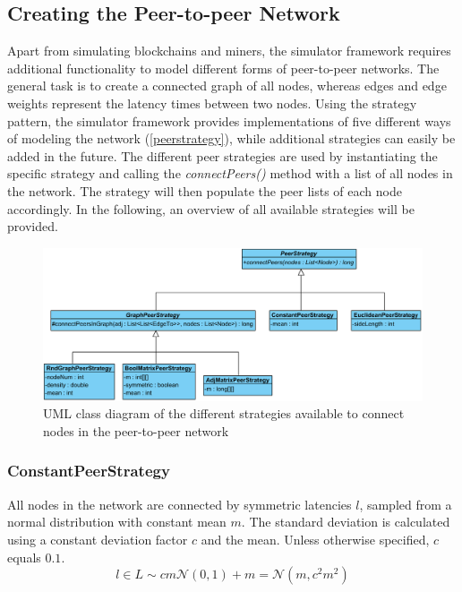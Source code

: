 \documentclass[a4paper,12pt,twoside]{report}
\begin{document}
\subsection{Creating the Peer-to-peer Network} \label{peerstratsection}
Apart from simulating blockchains and miners, the simulator framework requires additional functionality to model different forms of peer-to-peer networks. The general task is to create a connected graph of all nodes, whereas edges and edge weights represent the latency times between two nodes. Using the strategy pattern\cite{strategy}, the simulator framework provides implementations of five different ways of modeling the network (\autoref{peerstrategy}), while additional strategies can easily be added in the future. The different peer strategies are used by instantiating the specific strategy and calling the \textit{connectPeers()} method with a list of all nodes in the network. The strategy will then populate the peer lists of each node accordingly. In the following, an overview of all available strategies will be provided.
\begin{figure}[ht]
	\centering
  \includegraphics[width=\textwidth]{PeerStrategy.png}
	\caption{UML class diagram of the different strategies available to connect nodes in the peer-to-peer network}
	\label{peerstrategy}
\end{figure}
\subsubsection{ConstantPeerStrategy}
All nodes in the network are connected by symmetric latencies $l$, sampled from a normal distribution with constant mean $m$. The standard deviation is calculated using a constant deviation factor $c$ and the mean. Unless otherwise specified, $c$ equals $0.1$.
\begin{equation}\label{distribution} 
l\in L\sim cm\mathcal{N}(0,1)+m = \mathcal{N}(m,c^{2}m^{2})
\end{equation}
\end{document}
